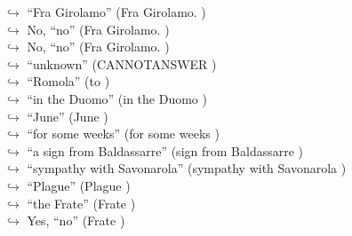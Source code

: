 \documentclass[11pt,a4paper, onecolumn]{article}
\begin{document}
\begin{figure}[t] \small \begin{tcolorbox}[boxsep=0pt,left=5pt,right=0pt,top=2pt,colback = yellow!5] \begin{dialogue}
 \small 
\colorbox{pink!25}{$\hookrightarrow$}
{ ``Fra Girolamo'' (Fra Girolamo. ) }
\\
\colorbox{pink!25}{$\hookrightarrow$}
\colorbox{red!25}{No,}
{ ``no'' (Fra Girolamo. ) }
\\
\colorbox{pink!25}{$\hookrightarrow$}
\colorbox{red!25}{No,}
{ ``no'' (Fra Girolamo. ) }
\\
\colorbox{pink!25}{$\hookrightarrow$}
{ ``unknown'' (CANNOTANSWER ) }
\\
\colorbox{pink!25}{$\hookrightarrow$}
{ ``Romola'' (to ) }
\\
\colorbox{pink!25}{$\hookrightarrow$}
{ ``in the Duomo'' (in the Duomo ) }
\\
\colorbox{pink!25}{$\hookrightarrow$}
{ ``June'' (June ) }
\\
\colorbox{pink!25}{$\hookrightarrow$}
{ ``for some weeks'' (for some weeks ) }
\\
\colorbox{pink!25}{$\hookrightarrow$}
{ ``a sign from Baldassarre'' (sign from Baldassarre ) }
\\
\colorbox{pink!25}{$\hookrightarrow$}
{ ``sympathy with Savonarola'' (sympathy with Savonarola ) }
\\
\colorbox{pink!25}{$\hookrightarrow$}
{ ``Plague'' (Plague ) }
\\
\colorbox{pink!25}{$\hookrightarrow$}
{ ``the Frate'' (Frate ) }
\\
\colorbox{pink!25}{$\hookrightarrow$}
\colorbox{red!25}{Yes,}
{ ``no'' (Frate ) }
\\
 \end{dialogue}\end{tcolorbox}\end{figure}
\end{document}
